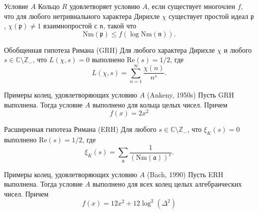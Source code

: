\documentclass[8pt, xcolor=x11names]{beamer}
\begin{document}
\begin{frame}
    \begin{block}{Условие $A$}
        Кольцо $R$ удовлетворяет условию $A$, если существует многочлен $f$, что для любого нетривиального характера Дирихле $\chi$ существует простой идеал $\mathfrak{p}$, $\chi(\mathfrak{p}) \neq 1$ взаимнопростой с $\mathfrak{n}$, такой что
        $$
            \textrm{Nm}(\mathfrak{p}) \le f(\log \textrm{Nm}(\mathfrak{n})).
        $$
    \end{block}
    
    \begin{block}{Обобщенная гипотеза Римана (GRH)}
        Для любого характера Дирихле $\chi$ и любого $s\in\mathbb{C}\setminus\mathbb{Z}_{-}$, что $L(\chi, s) = 0$ выполнено $\textrm{Re}(s) = 1/2$, где
        $$
            L(\chi ,s)=\sum _{n=1}^{\infty }{\frac {\chi (n)}{n^{s}}}.
        $$
    \end{block}
    
    \begin{block}{Примеры колец, удовлетворяющих условию $A$ (Ankeny, 1950s)}
        Пусть GRH выполнена.
        Тогда условие $A$ выполнено для кольца целых чисел.
        Причем
        $$
            f(x) = 2 x^2
        $$
    \end{block}
\end{frame}

\begin{frame}
    \begin{block}{Расширенная гипотеза Римана (ERH)}
        Для любого $s\in\mathbb{C}\setminus\mathbb{Z}_{-}$, что $\xi_K(s) = 0$ выполнено $\textrm{Re}(s) = 1/2$, где
        $$
            \xi_K(s) = \sum _{\mathfrak{a}} \frac{1}{(\textrm{Nm}(\mathfrak{a}))^s}.
        $$
    \end{block}
    
    \begin{block}{Примеры колец, удовлетворяющих условию $A$ (Bach, 1990)}
        Пусть ERH выполнена.
        Тогда условие $A$ выполнено для всех колец целых алгебраических чисел.
        Причем
        $$
            f(x) = 12 x^2 + 12 \log^2 (\Delta^2)
        $$
    \end{block}
\end{frame}
\end{document}
